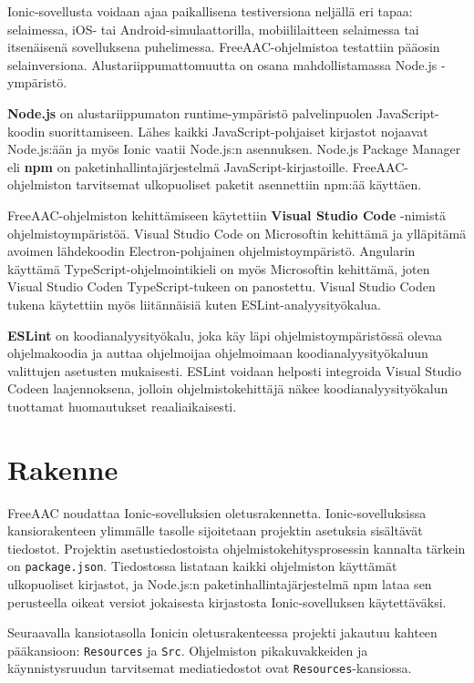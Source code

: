 \documentclass[utf8]{gradu3}
\begin{document}
Ionic-sovellusta voidaan ajaa paikallisena testiversiona neljällä eri tapaa: selaimessa, iOS- tai Android-simulaattorilla, mobiililaitteen selaimessa tai itsenäisenä sovelluksena puhelimessa. FreeAAC-ohjelmistoa testattiin pääosin selainversiona. Alustariippumattomuutta on osana mahdollistamassa Node.js -ympäristö.

\textbf{Node.js} on alustariippumaton runtime-ympäristö palvelinpuolen JavaScript-koodin suorittamiseen. Lähes kaikki JavaScript-pohjaiset kirjastot nojaavat Node.js:ään ja myös Ionic vaatii Node.js:n asennuksen. Node.js Package Manager eli \textbf{npm} on paketinhallintajärjestelmä JavaScript-kirjastoille. FreeAAC-ohjelmiston tarvitsemat ulkopuoliset paketit asennettiin npm:ää käyttäen.

FreeAAC-ohjelmiston kehittämiseen käytettiin \textbf{Visual Studio Code} -nimistä ohjelmistoympäristöä. Visual Studio Code on Microsoftin kehittämä ja ylläpitämä avoimen lähdekoodin Electron-pohjainen ohjelmistoympäristö. Angularin käyttämä TypeScript-ohjelmointikieli on myös Microsoftin kehittämä, joten Visual Studio Coden TypeScript-tukeen on panostettu. Visual Studio Coden tukena käytettiin myös liitännäisiä kuten ESLint-analyysityökalua.

\textbf{ESLint} on koodianalyysityökalu, joka käy läpi ohjelmistoympäristössä olevaa ohjelmakoodia ja auttaa ohjelmoijaa ohjelmoimaan koodianalyysityökaluun valittujen asetusten mukaisesti. ESLint voidaan helposti integroida Visual Studio Codeen laajennoksena, jolloin ohjelmistokehittäjä näkee koodianalyysityökalun tuottamat huomautukset reaaliaikaisesti.

\section{Rakenne}

FreeAAC noudattaa Ionic-sovelluksien oletusrakennetta. Ionic-sovelluksissa kansiorakenteen ylimmälle tasolle sijoitetaan projektin asetuksia sisältävät tiedostot. Projektin asetustiedostoista ohjelmistokehitysprosessin kannalta tärkein on \texttt{package.json}. Tiedostossa listataan kaikki ohjelmiston käyttämät ulkopuoliset kirjastot, ja Node.js:n paketinhallintajärjestelmä npm lataa sen perusteella oikeat versiot jokaisesta kirjastosta Ionic-sovelluksen käytettäväksi.

Seuraavalla kansiotasolla Ionicin oletusrakenteessa projekti jakautuu kahteen pääkansioon: \texttt{Resources} ja \texttt{Src}. Ohjelmiston pikakuvakkeiden ja käynnistysruudun tarvitsemat mediatiedostot ovat \texttt{Resources}-kansiossa.
\end{document}
